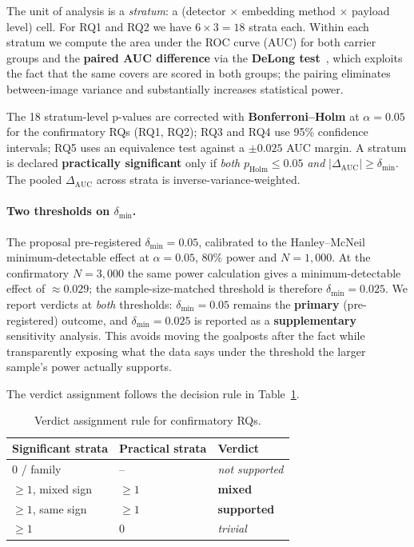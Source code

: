 \documentclass[10pt,twocolumn,a4paper]{article}
\begin{document}
The unit of analysis is a \emph{stratum}: a (detector $\times$ embedding method $\times$ payload level) cell. For RQ1 and RQ2 we have $6\!\times\!3\!=\!18$ strata each. Within each stratum we compute the area under the ROC curve (AUC) for both carrier groups and the \textbf{paired AUC difference} via the \textbf{DeLong test}~\cite{delong1988}, which exploits the fact that the same covers are scored in both groups; the pairing eliminates between-image variance and substantially increases statistical power.

The 18 stratum-level p-values are corrected with \textbf{Bonferroni--Holm} at $\alpha\!=\!0.05$ for the confirmatory RQs (RQ1, RQ2); RQ3 and RQ4 use 95\% confidence intervals; RQ5 uses an equivalence test against a $\pm0.025$ AUC margin. A stratum is declared \textbf{practically significant} only if \emph{both} $p_\text{Holm}\!\leq\!0.05$ \emph{and} $|\Delta_\text{AUC}|\!\geq\!\delta_\text{min}$. The pooled $\Delta_\text{AUC}$ across strata is inverse-variance-weighted.

\paragraph{Two thresholds on $\delta_\text{min}$.} The proposal pre-registered $\delta_\text{min}\!=\!0.05$, calibrated to the Hanley--McNeil minimum-detectable effect at $\alpha\!=\!0.05$, $80\%$ power and $N\!=\!1{,}000$. At the confirmatory $N\!=\!3{,}000$ the same power calculation gives a minimum-detectable effect of $\approx\!0.029$; the sample-size-matched threshold is therefore $\delta_\text{min}\!=\!0.025$. We report verdicts at \emph{both} thresholds: $\delta_\text{min}\!=\!0.05$ remains the \textbf{primary} (pre-registered) outcome, and $\delta_\text{min}\!=\!0.025$ is reported as a \textbf{supplementary} sensitivity analysis. This avoids moving the goalposts after the fact while transparently exposing what the data says under the threshold the larger sample's power actually supports.

The verdict assignment follows the decision rule in Table~\ref{tab:verdictrule}.

\begin{table}[h]
\centering\small
\caption{Verdict assignment rule for confirmatory RQs.}
\label{tab:verdictrule}
\setlength{\tabcolsep}{6pt}\renewcommand{\arraystretch}{1.1}
\begin{tabular}{@{}lll@{}}
\toprule
\textbf{Significant strata} & \textbf{Practical strata} & \textbf{Verdict} \\
\midrule
0 / family            & --             & \emph{not supported} \\
$\geq\!1$, mixed sign & $\geq\!1$      & \textbf{mixed}       \\
$\geq\!1$, same sign  & $\geq\!1$      & \textbf{supported}   \\
$\geq\!1$             & 0              & \emph{trivial}       \\
\bottomrule
\end{tabular}
\end{table}
\end{document}
